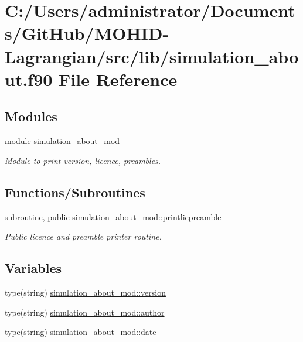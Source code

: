 \hypertarget{simulation__about_8f90}{}\section{C\+:/\+Users/administrator/\+Documents/\+Git\+Hub/\+M\+O\+H\+I\+D-\/\+Lagrangian/src/lib/simulation\+\_\+about.f90 File Reference}
\label{simulation__about_8f90}
\subsection*{Modules}
\begin{DoxyCompactItemize}
\item 
module \mbox{\hyperlink{namespacesimulation__about__mod}{simulation\+\_\+about\+\_\+mod}}
\begin{DoxyCompactList}\small\item\em Module to print version, licence, preambles. \end{DoxyCompactList}\end{DoxyCompactItemize}
\subsection*{Functions/\+Subroutines}
\begin{DoxyCompactItemize}
\item 
subroutine, public \mbox{\hyperlink{namespacesimulation__about__mod_ac436e98649d7488280cd176bbe765931}{simulation\+\_\+about\+\_\+mod\+::printlicpreamble}}
\begin{DoxyCompactList}\small\item\em Public licence and preamble printer routine. \end{DoxyCompactList}\end{DoxyCompactItemize}
\subsection*{Variables}
\begin{DoxyCompactItemize}
\item 
type(string) \mbox{\hyperlink{namespacesimulation__about__mod_aa52b892695e36d427843d6e035b37d36}{simulation\+\_\+about\+\_\+mod\+::version}}
\item 
type(string) \mbox{\hyperlink{namespacesimulation__about__mod_a49c4e8683dee7c3a2cd52658879c6e38}{simulation\+\_\+about\+\_\+mod\+::author}}
\item 
type(string) \mbox{\hyperlink{namespacesimulation__about__mod_ad2ae0e434e2c6b0221094f181a538dc6}{simulation\+\_\+about\+\_\+mod\+::date}}
\end{DoxyCompactItemize}
